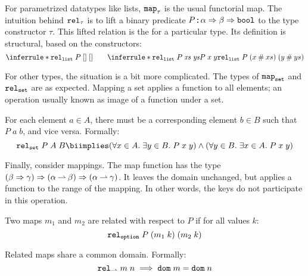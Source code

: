 For parametrized datatypes like lists, $\texttt{\textup{map}}_\tau$ is the usual functorial map.
The intuition behind $\texttt{\textup{rel}}_\tau$ is to lift a binary predicate $P \mathbin{:\!\!:} \alpha \Rightarrow \beta \Rightarrow \texttt{\textup{bool}}$ to the type constructor $\tau$.
This lifted relation is the  for a particular type.
Its definition is structural, based on the constructors:
%
\[
  \inferrule*{
  }{\holconst{rel}_{\holtype{list}}\;P\;[]\;[]} \qquad
  \inferrule*{
    \holconst{rel}_{\holtype{list}}\;P\;\mathit{xs}\;\mathit{ys} \\
    P\;x\;y
  }{\holconst{rel}_{\holtype{list}}\;P\;(x \cons xs)\;(y \cons ys)}
\]

For other types, the situation is a bit more complicated.
The types of $\texttt{\textup{map}}_{\texttt{\textup{set}}}$ and $\texttt{\textup{rel}}_{\texttt{\textup{set}}}$ are as expected.
Mapping a set applies a function to all elements; an operation usually known as image of a function under a set.

\begin{definition}
  For each element $a \in A$, there must be a corresponding element $b \in B$ such that $P\;a\;b$, and vice versa. Formally:
  \[ \holconst{rel}_{\holtype{set}}\;P\;A\;B \biimplies (\forall x \in A.\; \exists y \in B.\; P\;x\;y) \wedge (\forall y \in B.\; \exists x \in A.\; P\;x\;y) \]
\end{definition}

\noindent
Finally, consider mappings.
The map function has the type $(\beta \Rightarrow \gamma) \Rightarrow (\alpha \mathbin{\rightharpoonup} \beta) \Rightarrow (\alpha \mathbin{\rightharpoonup} \gamma)$.
It leaves the domain unchanged, but applies a function to the range of the mapping.
In other words, the keys do not participate in this operation.

\begin{definition}
  Two maps $m_1$ and $m_2$ are related with respect to $P$ if for all values $k$:
    \[ \texttt{\textup{rel}}_{\texttt{\textup{option}}}\;P\;(m_1\;k)\;(m_2\;k) \]
\end{definition}

\begin{corollary}
  Related maps share a common domain.
  Formally:
  \[ \texttt{\textup{rel}}_{\mathbin{\rightharpoonup}}\;m\;n \implies \texttt{\textup{dom}}\;m = \texttt{\textup{dom}}\;n \]
\end{corollary}

